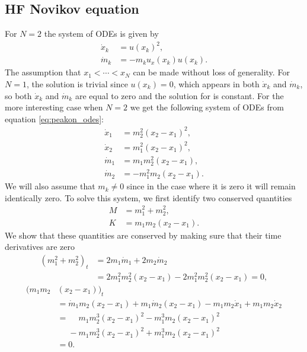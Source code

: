 \documentclass[english,master]{liumaiex}
\theoremstyle{plain}
\theoremstyle{definition}
\begin{document}
\subsection{HF Novikov equation}
For $N = 2$ the system of ODEs is given by
\begin{equation}
\begin{aligned}
	\dot{x}_k &= u(x_k)^2, \\
	\dot{m}_k &= -m_k u_x(x_k)u(x_k).
\end{aligned}
\end{equation}
The assumption that $x_1 < \cdots < x_N$ can be made without loss of generality. For $N = 1$, the solution is trivial since $u(x_k) = 0$, which appears in both $\dot{x}_k$ and $\dot{m}_k$, so both $\dot{x}_k$ and $\dot{m}_k$ are equal to zero and the solution for is constant. For the more interesting case when $N = 2$ we get the following system of ODEs from equation \eqref{eq:peakon_odes}:
%
\begin{align}
	\dot{x}_1 & = m_2^2 (x_2 - x_1)^2, \\
	\dot{x}_2 & = m_1^2 (x_2 - x_1)^2, \\
	\dot{m}_1 & = m_1 m_2^2(x_2 - x_1),  \\
	\dot{m}_2 & = -m_1^2 m_2(x_2 - x_1).
\end{align}
%
We will also assume that $m_k \neq 0$ since in the case where it is zero it will remain identically zero.
%
To solve this system, we first identify two conserved quantities
\begin{align}
	\label{eq:solution_2N_M}
	M &= m_1^2 + m_2^2, \\
	\label{eq:solution_2N_K}
	K &= m_1m_2(x_2 - x_1).
\end{align}
%
We show that these quantities are conserved by making sure that their time derivatives are zero
\begin{equation}
\begin{aligned}
	(m_1^2 + m_2^2)_t 
	&= 2m_1\dot{m}_1 + 2m_2\dot{m}_2 \\
	&= 2m_1^2m_2^2(x_2 - x_1) - 2m_1^2m_2^2(x_2 - x_1) = 0,
\end{aligned}
\end{equation}
\begin{equation}
\begin{aligned}
	(m_1m_2&(x_2 - x_1))_t \\
	&= \dot{m}_1m_2(x_2 - x_1) + m_1\dot{m}_2(x_2 - x_1)
	- m_1m_2\dot{x}_1 + m_1m_2\dot{x}_2 \\
	&=\phantom{-} m_1m_2^3(x_2 - x_1)^2 - m_1^3m_2(x_2 - x_1)^2 \\
	&\phantom{=}- m_1m_2^3(x_2 - x_1)^2 + m_1^3m_2(x_2 - x_1)^2 \\
	&=0. \\
\end{aligned}
\end{equation}
\end{document}
